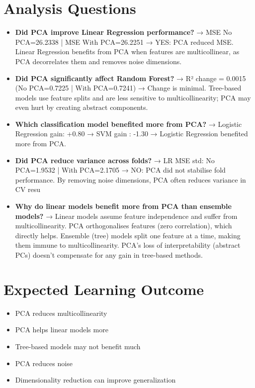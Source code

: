 \documentclass[11pt]{article}
\begin{document}

\section{Analysis Questions}

\begin{itemize}
\item \textbf{Did PCA improve Linear Regression performance?}
    → MSE No PCA=26.2338  |  MSE With PCA=26.2251
    → YES: PCA reduced MSE.
      Linear Regression benefits from PCA when features are multicollinear,
      as PCA decorrelates them and removes noise dimensions.
 
\item \textbf{Did PCA significantly affect Random Forest?}
    → R² change = 0.0015 (No PCA=0.7225  |  With PCA=0.7241)
    → Change is minimal.
      Tree-based models use feature splits and are less sensitive to
      multicollinearity; PCA may even hurt by creating abstract components.

 
\item \textbf{Which classification model benefited more from PCA?}
    → Logistic Regression gain: +0.80%
    → SVM gain               : -1.30%
    → Logistic Regression benefited more from PCA.
 
\item \textbf{Did PCA reduce variance across folds?}
    → LR MSE std: No PCA=1.9532  |  With PCA=2.1705
    → NO: PCA did not stabilise fold performance.
      By removing noise dimensions, PCA often reduces variance in CV resu
 
\item \textbf{Why do linear models benefit more from PCA than ensemble models?}
    → Linear models assume feature independence and suffer from multicollinearity.
      PCA orthogonalises features (zero correlation), which directly helps.
      Ensemble (tree) models split one feature at a time, making them immune
      to multicollinearity. PCA's loss of interpretability (abstract PCs)
      doesn't compensate for any gain in tree-based methods.

\end{itemize}
\section{Expected Learning Outcome}

\begin{itemize}

\item PCA reduces multicollinearity
\item PCA helps linear models more
\item Tree-based models may not benefit much
\item PCA reduces noise
\item Dimensionality reduction can improve generalization

\end{itemize}
\end{document}
